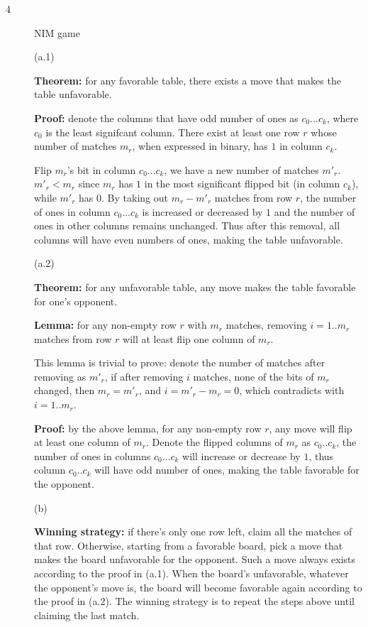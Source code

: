 \documentclass{article}
\begin{document}
\begin{description}
\item[4]{NIM game}

  (a.1) 

  \textbf{Theorem:} for any favorable table, there exists a move that makes the table unfavorable.

  \textbf{Proof:} denote the columns that have odd number of ones as $c_0...c_k$, where $c_0$ is the least signifcant column. There exist at least one row $r$ whose number of matches $m_r$, when expressed in binary, has $1$ in column $c_k$.

  Flip $m_r$'s bit in column $c_0...c_k$, we have a new number of matches $m'_r$. $m'_r < m_r$ since $m_r$ has $1$ in the most significant flipped bit (in column $c_k$), while $m'_r$ has $0$. By taking out $m_r - m'_r$ matches from row $r$, the number of ones in column $c_0...c_k$ is increased or decreased by $1$ and the number of ones in other columns remains unchanged. Thus after this removal, all columns will have even numbers of ones, making the table unfavorable.

  (a.2) 

  \textbf{Theorem:} for any unfavorable table, any move makes the table favorable for one’s opponent.

  \textbf{Lemma:} for any non-empty row $r$ with $m_r$ matches, removing $i=1..m_r$ matches from row $r$ will at least flip one column of $m_r$. 

  This lemma is trivial to prove: denote the number of matches after removing as $m'_r$, if after removing $i$ matches, none of the bits of $m_r$ changed, then $m_r = m'_r$, and $i = m'_r - m_r = 0$, which contradicts with $i=1..m_r$.

  \textbf{Proof:} by the above lemma, for any non-empty row $r$, any move will flip at least one column of $m_r$. Denote the flipped columns of $m_r$ as $c_0..c_k$, the number of ones in columns $c_0...c_k$ will increase or decrease by $1$, thus column $c_0..c_k$ will have odd number of ones, making the table favorable for the opponent.

  (b) 

  \textbf{Winning strategy:} if there's only one row left, claim all the matches of that row. Otherwise, starting from a favorable board, pick a move that makes the board unfavorable for the opponent. Such a move always exists according to the proof in (a.1). When the board's unfavorable, whatever the opponent's move is, the board will become favorable again according to the proof in (a.2). The winning strategy is to repeat the steps above until claiming the last match.

\end{description}
\end{document}
